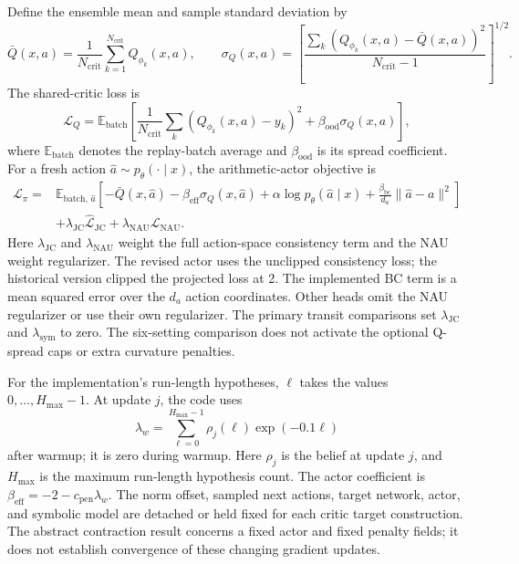 Define the ensemble mean and sample standard deviation by
\[
\bar Q(x,a)=\frac{1}{N_{\mathrm{crit}}}\sum_{k=1}^{N_{\mathrm{crit}}}Q_{\phi_k}(x,a),
\qquad
\sigma_Q(x,a)=
\left[\frac{\sum_k(Q_{\phi_k}(x,a)-\bar Q(x,a))^2}
{N_{\mathrm{crit}}-1}\right]^{1/2}.
\]
The shared-critic loss is
\begin{equation}
\mathcal L_Q=
\mathbb E_{\mathrm{batch}}\!\left[
\frac{1}{N_{\mathrm{crit}}}\sum_k(Q_{\phi_k}(x,a)-y_k)^2
+\beta_{\mathrm{ood}}\sigma_Q(x,a)\right],
\label{eq:critic_loss}
\end{equation}
where \(\mathbb E_{\mathrm{batch}}\) denotes the replay-batch average and
\(\beta_{\mathrm{ood}}\) is its spread coefficient.
For a fresh action \(\widehat a\sim p_\theta(\cdot\mid x)\), the arithmetic-actor objective is
\begin{equation}
\begin{split}
\mathcal L_\pi={}&
\mathbb E_{\mathrm{batch},\,\widehat a}
[-\bar Q(x,\widehat a)-\beta_{\mathrm{eff}}\sigma_Q(x,\widehat a)
+\alpha\log p_\theta(\widehat a\mid x)
+\frac{\beta_{\mathrm{bc}}}{d_a}\|\widehat a-a\|^2]\\
&+\lambda_{\mathrm{JC}}\widehat{\mathcal L}_{\mathrm{JC}}
+\lambda_{\mathrm{NAU}}\mathcal L_{\mathrm{NAU}}.
\end{split}
\label{eq:actor_loss}
\end{equation}
Here \(\lambda_{\mathrm{JC}}\) and \(\lambda_{\mathrm{NAU}}\) weight the
full action-space consistency term and the NAU weight regularizer. The revised
actor uses the unclipped consistency loss; the historical version clipped
the projected loss at 2. The implemented
BC term is a mean squared error over the \(d_a\) action coordinates.
Other heads omit the NAU regularizer or use their own regularizer.
The primary transit comparisons set \(\lambda_{\mathrm{JC}}\) and
\(\lambda_{\mathrm{sym}}\) to zero. The six-setting comparison does not
activate the optional Q-spread caps or extra curvature penalties.

For the implementation's run-length hypotheses, \(\ell\) takes the values
\(0,\ldots,H_{\max}-1\). At update \(j\), the code uses
\[
\lambda_w=\sum_{\ell=0}^{H_{\max}-1}\rho_j(\ell)\exp(-0.1\ell)
\]
after warmup; it is zero during warmup. Here \(\rho_j\) is the belief at
update \(j\), and \(H_{\max}\) is the maximum
run-length hypothesis count. The actor coefficient is
\(\beta_{\mathrm{eff}}=-2-c_{\mathrm{pen}}\lambda_w\).
The norm offset, sampled next actions, target network, actor, and symbolic
model are detached or held fixed for each critic target construction.
The abstract contraction result concerns a fixed actor and fixed penalty
fields; it does not establish convergence of these changing gradient updates.

